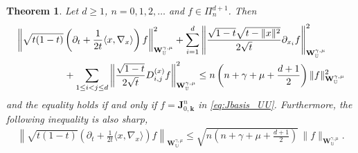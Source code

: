 \documentclass{amsart}
\newtheorem{thm}{Theorem}[section]
\theoremstyle{remark}
\def\la{{\langle}}
\def\ra{{\rangle}}
\def\g{{\gamma}}
\def\la{{\langle}}
\def\ra{{\rangle}}
\def\kb{{\mathbf k}}
\def\Jb{{\mathbf J}}
\def\Wb{{\mathbf W}}
\def\UU{{\mathbb U}}
\begin{document}
\begin{thm} \label{thm:B-ineqUJ}
Let $d \ge 1$, $n = 0,1,2,\ldots$ and $f \in \Pi_n^{d+1}$. Then
\begin{align} \label{eq:U-ineqJ1}
& \left\| \sqrt{ t(1-t)}  \left( \partial_t + \frac{1}{2t} \la x ,\nabla_x\ra \right) f\right \|_{\Wb_{\UU}^{\g,\mu}}^2 
  +  \sum_{i=1}^d \left \| \frac{\sqrt{1-t} \sqrt{t-\|x\|^2}}{2 \sqrt{t}} \partial_{x_i} f \right \|_{\Wb_{\UU}^{\g,\mu}}^2 \\
 & \qquad\qquad \quad 
  +  \sum_{1\le i<j\le d} \left \| \frac{\sqrt{1-t}}{2 \sqrt{t}}  D_{i, j}^{(x)} f \right \|_{\Wb_{\UU}^{\g,\mu}}^2
       \le n\left(n+\g+\mu+\frac{d+1}{2}\right) \|f \|_{\Wb_{\UU}^{\g,\mu}}^2 \notag
\end{align} 
and the equality holds if and only if $f= \Jb_{0,\kb}^n$ in \eqref{eq:Jbasis_UU}. 
Furthermore, the following inequality is also sharp, 
\begin{align}\label{eq:U-ineqJ2}
\left\| \sqrt{ t(1-t)}  \left( \partial_t + \frac{1}{2t} \la x ,\nabla_x\ra \right) f\right \|_{\Wb_{\UU}^{\g,\mu}}
  \le \sqrt{n\left(n+\g+\mu+\frac{d+1}{2}\right)} \, \|f \|_{\Wb_{\UU}^{\g,\mu}}.
\end{align}
\end{thm}
 
\end{document}
